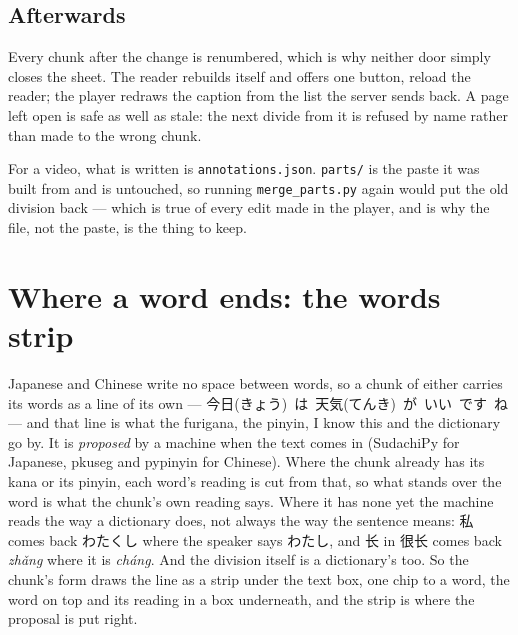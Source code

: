 \documentclass[11pt,oneside]{report}
\newcommand{\jw}[1]{\mbox{\foreignlanguage{japanese}{#1}}}
\newcommand{\cw}[1]{\mbox{\foreignlanguage{chinese}{#1}}}
\newcommand{\file}[1]{\texttt{#1}}
\newcommand{\menu}[1]{\textsf{#1}}
\begin{document}
\subsection*{Afterwards}

Every chunk after the change is renumbered, which is why neither door simply
closes the sheet. The reader rebuilds itself and offers one button,
\menu{reload the reader}; the player redraws the caption from the list the
server sends back. A page left open is safe as well as stale: the next divide
from it is refused by name rather than made to the wrong chunk.

For a video, what is written is \file{annotations.json}. \file{parts/} is the
paste it was built from and is untouched, so running \file{merge\_parts.py}
again would put the old division back --- which is true of every edit made in
the player, and is why the file, not the paste, is the thing to keep.

\section{Where a word ends: the words strip}
\label{sec:wordstrip}

Japanese and Chinese write no space between words, so a chunk of either
carries its words as a line of its own --- \jw{今日(きょう) は 天気(てんき) が
いい です ね} --- and that line is what the furigana, the pinyin,
\menu{I know this} and the dictionary go by. It is \emph{proposed} by a
machine when the text comes in (SudachiPy for Japanese, pkuseg and pypinyin
for Chinese). Where the chunk already has its kana or its pinyin, each word's
reading is cut from that, so what stands over the word is what the chunk's
own reading says. Where it has none yet the machine reads the way a
dictionary does, not always the way the sentence means: \jw{私} comes back
\jw{わたくし} where the speaker says \jw{わたし}, and \cw{长} in \cw{很长}
comes back \emph{zh\v{a}ng} where it is \emph{ch\'ang}. And the division
itself is a dictionary's too. So the chunk's form draws the
line as a strip under the text box, one chip to a word, the word on top and
its reading in a box underneath, and the strip is where the proposal is put
right.
\end{document}

